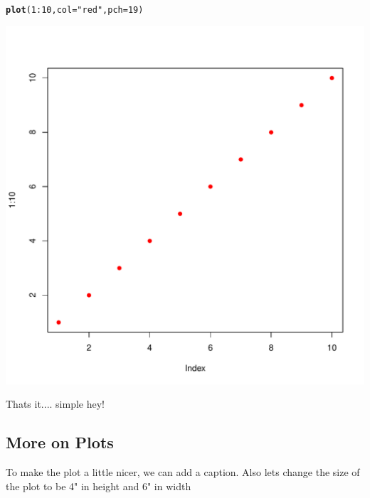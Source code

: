 \documentclass{article}\usepackage[]{graphicx}\usepackage[]{color}
\makeatletter
\def\maxwidth{ %
  \ifdim\Gin@nat@width>\linewidth
    \linewidth
  \else
    \Gin@nat@width
  \fi
}
\newcommand{\hlnum}[1]{\textcolor[rgb]{0.686,0.059,0.569}{#1}}%
\newcommand{\hlstr}[1]{\textcolor[rgb]{0.192,0.494,0.8}{#1}}%
\newcommand{\hlopt}[1]{\textcolor[rgb]{0,0,0}{#1}}%
\newcommand{\hlstd}[1]{\textcolor[rgb]{0.345,0.345,0.345}{#1}}%
\newcommand{\hlkwc}[1]{\textcolor[rgb]{0.333,0.667,0.333}{#1}}%
\newcommand{\hlkwd}[1]{\textcolor[rgb]{0.737,0.353,0.396}{\textbf{#1}}}%
\newenvironment{kframe}{%
 \def\at@end@of@kframe{}%
 \ifinner\ifhmode%
  \def\at@end@of@kframe{\end{minipage}}%
  \begin{minipage}{\columnwidth}%
 \fi\fi%
 \def\FrameCommand##1{\hskip\@totalleftmargin \hskip-\fboxsep
 \colorbox{shadecolor}{##1}\hskip-\fboxsep
     \hskip-\linewidth \hskip-\@totalleftmargin \hskip\columnwidth}%
 \MakeFramed {\advance\hsize-\width
   \@totalleftmargin\z@ \linewidth\hsize
   \@setminipage}}%
 {\par\unskip\endMakeFramed%
 \at@end@of@kframe}
\newenvironment{knitrout}{}{} %
\makeatother
\begin{document}
\begin{knitrout}
\color{fgcolor}\begin{kframe}
\begin{alltt}
\hlkwd{plot}\hlstd{(}\hlnum{1}\hlopt{:}\hlnum{10}\hlstd{,} \hlkwc{col}\hlstd{=}\hlstr{"red"}\hlstd{,} \hlkwc{pch}\hlstd{=}\hlnum{19}\hlstd{)}
\end{alltt}
\end{kframe}
\includegraphics[width=\maxwidth]{figure/test2-1} 

\end{knitrout}

Thats it.... simple hey!


\subsection{More on Plots}

To make the plot a little nicer, we can add a caption. Also lets change the size of the plot to be 4" in height and 6" in width
\end{document}
